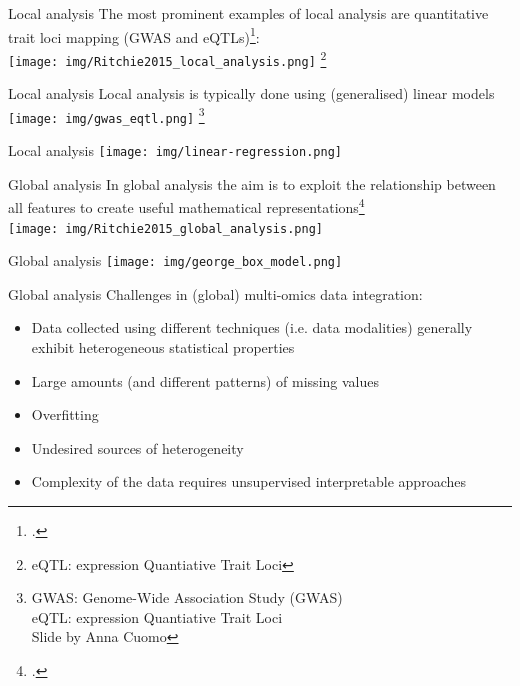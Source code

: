 \documentclass[aspectratio=169,notes]{beamer}
\newcommand\blfootnote[1]{%
  \begingroup
  \renewcommand\thefootnote{}\footnote{#1}%
  \addtocounter{footnote}{-1}%
  \endgroup
}
\begin{document}
	\begin{frame}{Local analysis}
	The most prominent examples of local analysis are quantitative trait loci mapping (GWAS and eQTLs)\footcite{Ritchie2015}:\\
	\leavevmode\newline
	\centering
	\texttt{[image: img/Ritchie2015\_local\_analysis.png]}
	\blfootnote{eQTL: expression Quantiative Trait Loci}
	\end{frame}

	\begin{frame}{Local analysis}
	Local analysis is typically done using (generalised) linear models\\
	\leavevmode\newline
	\centering
	\texttt{[image: img/gwas\_eqtl.png]}
	\blfootnote{GWAS: Genome-Wide Association Study (GWAS)\\eQTL: expression Quantiative Trait Loci\\Slide by Anna Cuomo}
	\end{frame}

	\begin{frame}{Local analysis}
	\leavevmode\newline
	\centering
	\texttt{[image: img/linear-regression.png]}
	\end{frame}



	\begin{frame}{Global analysis}
	In global analysis the aim is to exploit the relationship between all features to create useful mathematical representations\footcite{Ritchie2015}\\
	\leavevmode\newline
	\centering
	\texttt{[image: img/Ritchie2015\_global\_analysis.png]}
	\end{frame}


	\begin{frame}{Global analysis}
	\leavevmode\newline
	\centering
	\texttt{[image: img/george\_box\_model.png]}
	\end{frame}

	\begin{frame}{Global analysis}
	Challenges in (global) multi-omics data integration:
	\begin{itemize}
		\item Data collected using different techniques (i.e. data modalities) generally exhibit heterogeneous statistical properties
		\item Large amounts (and different patterns) of missing values
		\item Overfitting
		\item Undesired sources of heterogeneity
		\item Complexity of the data requires unsupervised interpretable approaches
	\end{itemize}
	\end{frame}
\end{document}

